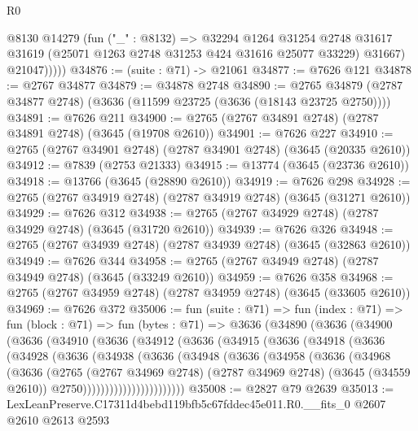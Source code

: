 \begin{lexlean}{R0}
\begin{coremodule}
              @8130
              @14279
              (fun ("_" : @8132) =>
              @32294
                @1264
                @31254
                @2748
                @31617
                @31619
                (@25071 @1263 @2748 @31253 @424 @31616 @25077 @33229)
                @31667)
              @21047)))))
@34876 := (suite : @71) -> @21061
@34877 := @7626 @121
@34878 := @2767 @34877
@34879 := @34878 @2748
@34890 := @2765 @34879 (@2787 @34877 @2748) (@3636 (@11599 @23725 (@3636 (@18143 @23725 @2750))))
@34891 := @7626 @211
@34900 := @2765 (@2767 @34891 @2748) (@2787 @34891 @2748) (@3645 (@19708 @2610))
@34901 := @7626 @227
@34910 := @2765 (@2767 @34901 @2748) (@2787 @34901 @2748) (@3645 (@20335 @2610))
@34912 := @7839 (@2753 @21333)
@34915 := @13774 (@3645 (@23736 @2610))
@34918 := @13766 (@3645 (@28890 @2610))
@34919 := @7626 @298
@34928 := @2765 (@2767 @34919 @2748) (@2787 @34919 @2748) (@3645 (@31271 @2610))
@34929 := @7626 @312
@34938 := @2765 (@2767 @34929 @2748) (@2787 @34929 @2748) (@3645 (@31720 @2610))
@34939 := @7626 @326
@34948 := @2765 (@2767 @34939 @2748) (@2787 @34939 @2748) (@3645 (@32863 @2610))
@34949 := @7626 @344
@34958 := @2765 (@2767 @34949 @2748) (@2787 @34949 @2748) (@3645 (@33249 @2610))
@34959 := @7626 @358
@34968 := @2765 (@2767 @34959 @2748) (@2787 @34959 @2748) (@3645 (@33605 @2610))
@34969 := @7626 @372
@35006 := fun (suite : @71) =>
  fun (index : @71) =>
  fun (block : @71) =>
  fun (bytes : @71) =>
  @3636
    (@34890
      (@3636
        (@34900
          (@3636
            (@34910
              (@3636
                (@34912
                  (@3636
                    (@34915
                      (@3636
                        (@34918
                          (@3636
                            (@34928
                              (@3636
                                (@34938
                                  (@3636
                                    (@34948
                                      (@3636
                                        (@34958
                                          (@3636
                                            (@34968
                                              (@3636
                                                (@2765
                                                  (@2767 @34969 @2748)
                                                  (@2787 @34969 @2748)
                                                  (@3645 (@34559 @2610))
                                                  @2750)))))))))))))))))))))))
@35008 := @2827 @79 @2639
@35013 := LexLeanPreserve.C17311d4bebd119bfb5c67fddec45e011.R0.__fits_0 @2607 @2610 @2613 @2593

\end{coremodule}
\end{lexlean}
